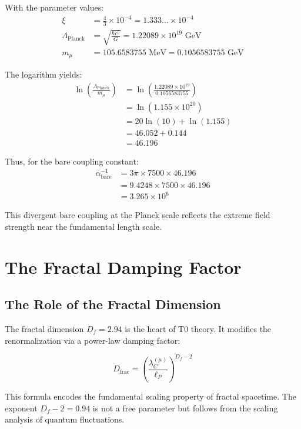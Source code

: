 \documentclass[12pt,a4paper]{article}
\theoremstyle{definition}
\begin{document}
	With the parameter values:
	\begin{align}
		\xi &= \frac{4}{3} \times 10^{-4} = 1.333\ldots \times 10^{-4}\\
		\Lambda_{\text{Planck}} &= \sqrt{\frac{\hbar c^5}{G}} = 1.22089 \times 10^{19} \text{ GeV}\\
		m_{\mu} &= 105.6583755 \text{ MeV} = 0.1056583755 \text{ GeV}
	\end{align}
	
	The logarithm yields:
	\begin{align}
		\ln\left(\frac{\Lambda_{\text{Planck}}}{m_{\mu}}\right) &= \ln\left(\frac{1.22089 \times 10^{19}}{0.1056583755}\right)\\
		&= \ln(1.155 \times 10^{20})\\
		&= 20 \ln(10) + \ln(1.155)\\
		&= 46.052 + 0.144\\
		&= 46.196
	\end{align}
	
	Thus, for the bare coupling constant:
	\begin{align}
		\alpha_{\text{bare}}^{-1} &= 3\pi \times 7500 \times 46.196\\
		&= 9.4248 \times 7500 \times 46.196\\
		&= 3.265 \times 10^6
	\end{align}
	
	This divergent bare coupling at the Planck scale reflects the extreme field strength near the fundamental length scale.
	
	\section{The Fractal Damping Factor}
	
	\subsection{The Role of the Fractal Dimension}
	
	The fractal dimension $D_f = 2.94$ is the heart of T0 theory. It modifies the renormalization via a power-law damping factor:
	
	\begin{equation}
		D_{\text{frac}} = \left(\frac{\lambda_C^{(\mu)}}{\ell_P}\right)^{D_f - 2}
	\end{equation}
	
	This formula encodes the fundamental scaling property of fractal spacetime. The exponent $D_f - 2 = 0.94$ is not a free parameter but follows from the scaling analysis of quantum fluctuations.
	
\end{document}
